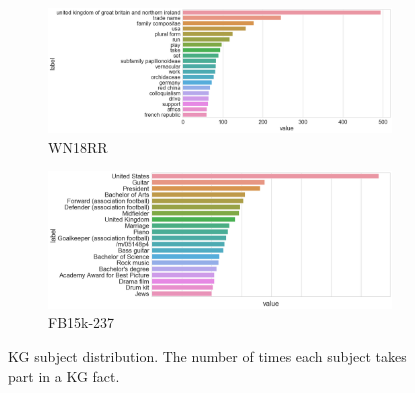 
\begin{figure}[H]
	\begin{subfigure}[b]{.5\linewidth}
   		\centering
    		\includegraphics[width=1.0\linewidth, height=0.7\linewidth]{WN18RR_Subject_Counts}
		\captionsetup{justification=centering}
		\caption{WN18RR}
	\end{subfigure}
	\begin{subfigure}[b]{.5\linewidth}
   		\centering
		\includegraphics[width=1.0\linewidth, height=0.7\linewidth]{FB15k-237_Subject_Counts}
		\captionsetup{justification=centering}
		\caption{FB15k-237}
	\end{subfigure}
	\caption{KG subject distribution. The number of times each subject takes part in a KG fact.}
\end{figure}

